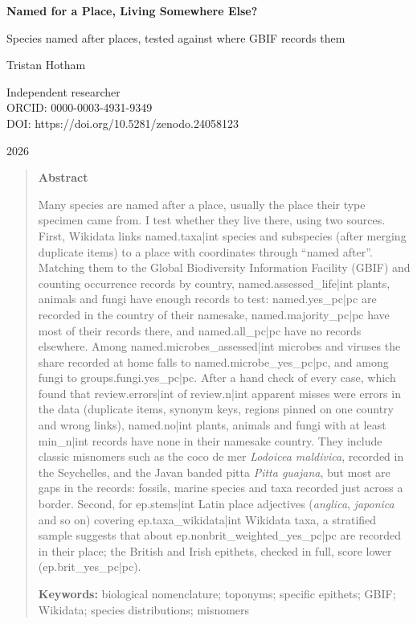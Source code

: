\documentclass[11pt,a4paper]{article}
\begin{document}
\begin{center}
{\Large\bfseries Named for a Place, Living Somewhere Else?\par}
\vspace{0.4em}
{\large Species named after places, tested against where GBIF records them\par}
\vspace{1.2em}
{\large Tristan Hotham\par}
\vspace{0.3em}
{\small Independent researcher\\
ORCID: 0000-0003-4931-9349\\
DOI: https://doi.org/10.5281/zenodo.24058123\par}
\vspace{0.8em}
2026
\end{center}

\begin{quote}
\small
\begin{center}\textbf{Abstract}\end{center}
Many species are named after a place, usually the place their type specimen came from. I test whether they live there, using two sources. First, Wikidata links {{named.taxa|int}} species and subspecies (after merging duplicate items) to a place with coordinates through ``named after''. Matching them to the Global Biodiversity Information Facility (GBIF) and counting occurrence records by country, {{named.assessed_life|int}} plants, animals and fungi have enough records to test: {{named.yes_pc|pc}} are recorded in the country of their namesake, {{named.majority_pc|pc}} have most of their records there, and {{named.all_pc|pc}} have no records elsewhere. Among {{named.microbes_assessed|int}} microbes and viruses the share recorded at home falls to {{named.microbe_yes_pc|pc}}, and among fungi to {{groups.fungi.yes_pc|pc}}. After a hand check of every case, which found that {{review.errors|int}} of {{review.n|int}} apparent misses were errors in the data (duplicate items, synonym keys, regions pinned on one country and wrong links), {{named.no|int}} plants, animals and fungi with at least {{min_n|int}} records have none in their namesake country. They include classic misnomers such as the coco de mer \textit{Lodoicea maldivica}, recorded in the Seychelles, and the Javan banded pitta \textit{Pitta guajana}, but most are gaps in the records: fossils, marine species and taxa recorded just across a border. Second, for {{ep.stems|int}} Latin place adjectives (\textit{anglica}, \textit{japonica} and so on) covering {{ep.taxa_wikidata|int}} Wikidata taxa, a stratified sample suggests that about {{ep.nonbrit_weighted_yes_pc|pc}} are recorded in their place; the British and Irish epithets, checked in full, score lower ({{ep.brit_yes_pc|pc}}).

\textbf{Keywords:} biological nomenclature; toponyms; specific epithets; GBIF; Wikidata; species distributions; misnomers
\end{quote}
\end{document}
